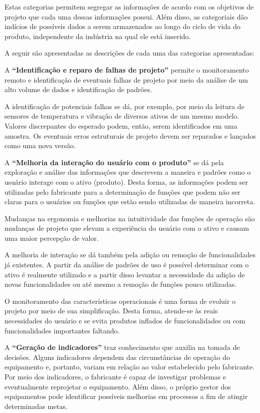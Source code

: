 Estas categorias permitem segregar as informações de acordo com os objetivos de projeto que cada uma dessas informações possui. Além disso, as categoriais dão indícios de possíveis dados a serem armazenados ao longo do ciclo de vida do produto, independente da indústria na qual ele está inserido.

A seguir são apresentadas as descrições de cada uma das categorias apresentadas:

A \textbf{``Identificação e reparo de falhas de projeto''} permite o monitoramento remoto e identificação de eventuais falhas de projeto por meio da análise de um alto volume de dados e identificação de padrões.

A identificação de potenciais falhas se dá, por exemplo, por meio da leitura de sensores de temperatura e vibração de diversos ativos de um mesmo modelo. Valores discrepantes do esperado podem, então, serem identificados em uma amostra. Os eventuais erros estruturais de projeto devem ser reparados e lançados como uma nova versão.

A \textbf{``Melhoria da interação do usuário com o produto''} se dá pela exploração e análise das informações que descrevem a maneira e padrões como o usuário interage com o ativo (produto). Desta forma, as informações podem ser utilizadas pelo fabricante para a determinação de funções que podem não ser claras para o usuários ou funções que estão sendo utilizadas de maneira incorreta.

Mudanças na ergonomia e melhorias na intuitividade das funções de operação são mudanças de projeto que elevam a experiência do usuário com o ativo e causam uma maior percepção de valor.

A melhoria de interação se dá também pela adição ou remoção de funcionalidades já existentes. A partir da análise de padrões de uso é possível determinar com o ativo é realmente utilizado e a partir disso levantar a necessidade da adição de novas funcionalidades ou até mesmo a remoção de funções pouco utilizadas.

O monitoramento das características operacionais é uma forma de evoluir o projeto por meio de sua simplificação. Desta forma, atende-se às reais necessidades do usuário e se evita produtos inflados de funcionalidades ou com funcionalidades importantes faltando.

A \textbf{``Geração de indicadores''} traz conhecimento que auxilia na tomada de decisões. Alguns indicadores dependem das circunstâncias de operação do equipamento e, portanto, variam em relação ao valor estabelecido pelo fabricante. Por meio dos indicadores, o fabricante é capaz de investigar problemas e eventualmente reprojetar o equipamento. Além disso, o próprio gestor dos equipamentos pode identificar possíveis melhorias em processos a fim de atingir determinadas metas.

